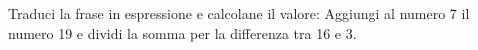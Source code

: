 \item Traduci la frase in espressione e calcolane il valore: Aggiungi al numero 7 il numero 19 e dividi la somma per la differenza tra 16 e 3.